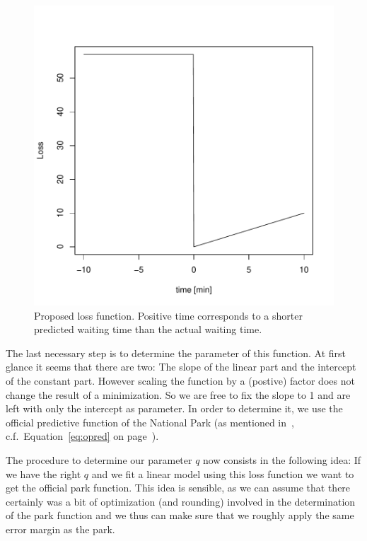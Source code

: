 \documentclass[english,final]{scrartcl}
\begin{document}
\begin{figure}[htbp]
\centering
\includegraphics{Geyser-Analysis-plot_loss}
\caption{Proposed loss function. Positive time corresponds to a shorter predicted waiting time than the actual waiting time.}
\label{fig:loss}
\end{figure}

The last necessary step is to determine the parameter of this function. At first glance it seems that there are two: The slope of the linear part and the intercept of the constant part. However scaling the function by a (postive) factor does not change the result of a minimization. So we are free to fix the slope to 1 and are left with only the intercept as parameter. In order to determine it, we use the official predictive function of the National Park (as mentioned in~\cite{pred}, c.f.\ Equation~\eqref{eq:opred} on page~\pageref{eq:opred}).

The procedure to determine our parameter $q$ now consists in the following idea: If we have the right $q$ and we fit a linear model using this loss function we want to get the official park function. This idea is sensible, as we can assume that there certainly was a bit of optimization (and rounding) involved in the determination of the park function and we thus can make sure that we roughly apply the same error margin as the park.
\end{document}

